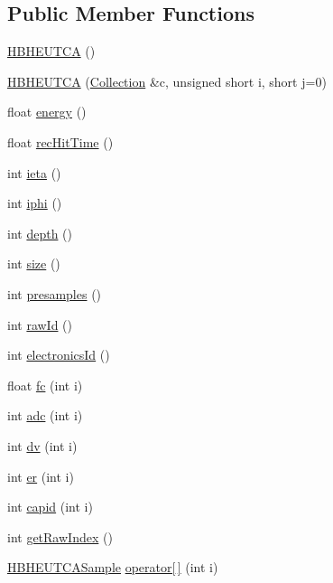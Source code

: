 \subsection*{Public Member Functions}
\begin{DoxyCompactItemize}
\item 
\hyperlink{class_h_b_h_e_u_t_c_a_a8bb7c04c0aaef5ac329bb2ab58c68606}{H\+B\+H\+E\+U\+T\+C\+A} ()
\item 
\hyperlink{class_h_b_h_e_u_t_c_a_aaf14978345ef0227706c297e98179a44}{H\+B\+H\+E\+U\+T\+C\+A} (\hyperlink{class_collection}{Collection} \&c, unsigned short i, short j=0)
\item 
float \hyperlink{class_h_b_h_e_u_t_c_a_a90f3f6a187dfc4a7daab1eec62403a11}{energy} ()
\item 
float \hyperlink{class_h_b_h_e_u_t_c_a_aff798ca66309c09608573f0c4a0deaff}{rec\+Hit\+Time} ()
\item 
int \hyperlink{class_h_b_h_e_u_t_c_a_a58e2f67223522ef6b3722e05cd9f27e2}{ieta} ()
\item 
int \hyperlink{class_h_b_h_e_u_t_c_a_a8a18a62e86b585d657450032fd4a364b}{iphi} ()
\item 
int \hyperlink{class_h_b_h_e_u_t_c_a_aeaf0cb6c915c4eb6ff434d8958a89dcb}{depth} ()
\item 
int \hyperlink{class_h_b_h_e_u_t_c_a_aa7a56c86797c67add0f34999e3d7b69d}{size} ()
\item 
int \hyperlink{class_h_b_h_e_u_t_c_a_a4a4e3c399d97f65a0039fa564d03de06}{presamples} ()
\item 
int \hyperlink{class_h_b_h_e_u_t_c_a_a6a8cf86fb45a78134eb0a050760c40a1}{raw\+Id} ()
\item 
int \hyperlink{class_h_b_h_e_u_t_c_a_a38a9cae6397668a3193f94ec7b7228e7}{electronics\+Id} ()
\item 
float \hyperlink{class_h_b_h_e_u_t_c_a_ab20263c255cc955b2011c38fb0e65463}{fc} (int i)
\item 
int \hyperlink{class_h_b_h_e_u_t_c_a_abeffd6ef4e4023b16b3e34b4ee08946a}{adc} (int i)
\item 
int \hyperlink{class_h_b_h_e_u_t_c_a_a73c8777b58168a278e6232ade243feb5}{dv} (int i)
\item 
int \hyperlink{class_h_b_h_e_u_t_c_a_a43349b34a4d3fd699feb4b794b47edd8}{er} (int i)
\item 
int \hyperlink{class_h_b_h_e_u_t_c_a_ae7aa759c1fa1e23d7afe5f7041232cf0}{capid} (int i)
\item 
int \hyperlink{class_h_b_h_e_u_t_c_a_a8b496828bb0af26a060965c293bbaab2}{get\+Raw\+Index} ()
\item 
\hyperlink{class_h_b_h_e_u_t_c_a_sample}{H\+B\+H\+E\+U\+T\+C\+A\+Sample} \hyperlink{class_h_b_h_e_u_t_c_a_a038fc4d276ae07cb28d1a486e881433c}{operator\mbox{[}$\,$\mbox{]}} (int i)
\end{DoxyCompactItemize}
